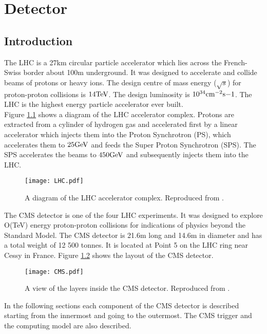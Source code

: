 \chapter{Detector}

\section{Introduction}

The LHC is a 27km circular particle accelerator which lies across the
French-Swiss border about 100m underground. It was designed to accelerate and 
collide beams of protons or heavy ions. The design centre of mass energy
($\sqrt{s}$) for proton-proton collisions is $14\mbox{TeV}$. The design luminosity is
$10^{34}\mbox{cm}^{-2}\mbox{s}{-1}$. The LHC is the highest energy particle accelerator ever
built. \\

Figure \ref{fig:LHC} shows a diagram of the LHC accelerator complex. Protons are
extracted from a cylinder of hydrogen gas and accelerated first by a linear
accelerator which injects them into the Proton Synchrotron (PS), which 
accelerates them to $25\mbox{GeV}$ and feeds the Super Proton Synchrotron (SPS). The
SPS accelerates the beams to $450\mbox{GeV}$ and subsequently injects them into the
LHC. \\

\begin{figure}
\texttt{[image: LHC.pdf]}
\label{fig:LHC}
\caption{A diagram of the LHC accelerator complex. Reproduced from
\cite{physics_tdr_1}.}
\end{figure}

The CMS detector is one of the four LHC experiments. It was designed to explore 
O(TeV) energy proton-proton collisions for indications of physics beyond the 
Standard Model. The CMS detector is 21.6m long and 14.6m in diameter and has a 
total weight of 12 500 tonnes. It is located at Point 5 on the LHC ring near 
Cessy in France. Figure \ref{fig:CMS} shows the layout of the CMS detector. \\

\begin{figure}
\texttt{[image: CMS.pdf]}
\label{fig:CMS}
\caption{A view of the layers inside the CMS detector. Reproduced from
\cite{physics_tdr_1}.}
\end{figure}

In the following sections each component of the CMS detector is described 
starting from the innermost and going to the outermost. The CMS trigger and the
computing model are also described. 

